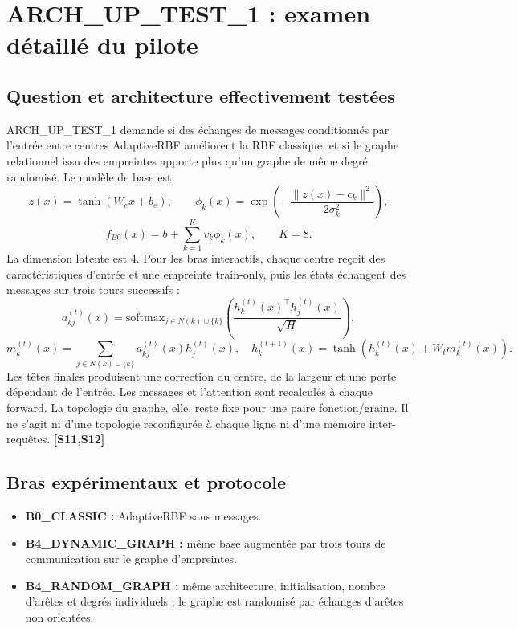 \documentclass[11pt,a4paper]{article}
\newcommand{\src}[1]{\textbf{[#1]}}
\newcommand{\softmax}{\mathrm{softmax}}
\begin{document}
\section{ARCH\_UP\_TEST\_1 : examen détaillé du pilote}

\subsection{Question et architecture effectivement testées}

ARCH\_UP\_TEST\_1 demande si des échanges de messages conditionnés par l'entrée entre centres AdaptiveRBF améliorent la RBF classique, et si le graphe relationnel issu des empreintes apporte plus qu'un graphe de même degré randomisé. Le modèle de base est
\[
 z(x)=\tanh(W_e x+b_e),\qquad
 \phi_k(x)=\exp\!\left(-\frac{\|z(x)-c_k\|^2}{2\sigma_k^2}\right),
\]
\[
 f_{B0}(x)=b+\sum_{k=1}^{K}v_k\phi_k(x),\qquad K=8.
\]
La dimension latente est 4. Pour les bras interactifs, chaque centre reçoit des caractéristiques d'entrée et une empreinte train-only, puis les états échangent des messages sur trois tours successifs :
\[
 a_{kj}^{(t)}(x)=\softmax_{j\in N(k)\cup\{k\}}
 \left(\frac{h_k^{(t)}(x)^\top h_j^{(t)}(x)}{\sqrt H}\right),
\]
\[
 m_k^{(t)}(x)=\sum_{j\in N(k)\cup\{k\}}a_{kj}^{(t)}(x)h_j^{(t)}(x),\quad
 h_k^{(t+1)}(x)=\tanh(h_k^{(t)}(x)+W_t m_k^{(t)}(x)).
\]
Les têtes finales produisent une correction du centre, de la largeur et une porte dépendant de l'entrée. Les messages et l'attention sont recalculés à chaque forward. La topologie du graphe, elle, reste fixe pour une paire fonction/graine. Il ne s'agit ni d'une topologie reconfigurée à chaque ligne ni d'une mémoire inter-requêtes. \src{S11,S12}

\subsection{Bras expérimentaux et protocole}

\begin{itemize}
  \item \textbf{B0\_CLASSIC :} AdaptiveRBF sans messages.
  \item \textbf{B4\_DYNAMIC\_GRAPH :} même base augmentée par trois tours de communication sur le graphe d'empreintes.
  \item \textbf{B4\_RANDOM\_GRAPH :} même architecture, initialisation, nombre d'arêtes et degrés individuels ; le graphe est randomisé par échanges d'arêtes non orientées.
\end{itemize}
\end{document}

